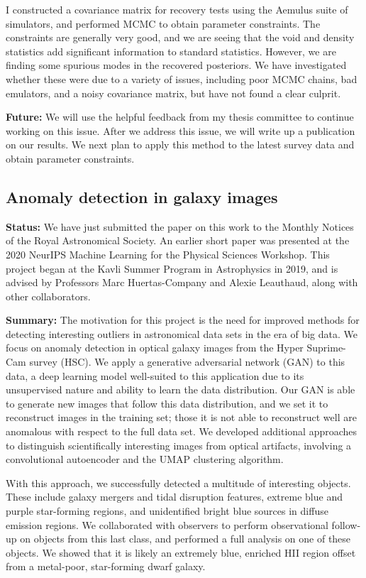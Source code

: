 \documentclass{article}
\begin{document}
I constructed a covariance matrix for recovery tests using the Aemulus suite of simulators, and performed MCMC to obtain parameter constraints.
The constraints are generally very good, and we are seeing that the void and density statistics add significant information to standard statistics.
However, we are finding some spurious modes in the recovered posteriors.
We have investigated whether these were due to a variety of issues, including poor MCMC chains, bad emulators, and a noisy covariance matrix, but have not found a clear culprit.

\textbf{Future:}
We will use the helpful feedback from my thesis committee to continue working on this issue.
After we address this issue, we will write up a publication on our results.
We next plan to apply this method to the latest survey data and obtain parameter constraints.

\subsection{Anomaly detection in galaxy images}

\hspace{\parindent} \textbf{Status:}
We have just submitted the paper on this work to the Monthly Notices of the Royal Astronomical Society.
An earlier short paper was presented at the 2020 NeurIPS Machine Learning for the Physical Sciences Workshop.
This project began at the Kavli Summer Program in Astrophysics in 2019, and is advised by Professors Marc Huertas-Company and Alexie Leauthaud, along with other collaborators.

\textbf{Summary:}
The motivation for this project is the need for improved methods for detecting interesting outliers in astronomical data sets in the era of big data.
We focus on anomaly detection in optical galaxy images from the Hyper Suprime-Cam survey (HSC).
We apply a generative adversarial network (GAN) to this data, a deep learning model well-suited to this application due to its unsupervised nature and ability to learn the data distribution.
Our GAN is able to generate new images that follow this data distribution, and we set it to reconstruct images in the training set; those it is not able to reconstruct well are anomalous with respect to the full data set.
We developed additional approaches to distinguish scientifically interesting images from optical artifacts, involving a convolutional autoencoder and the UMAP clustering algorithm.

With this approach, we successfully detected a multitude of interesting objects.
These include galaxy mergers and tidal disruption features, extreme blue and purple star-forming regions, and unidentified bright blue sources in diffuse emission regions.
We collaborated with observers to perform observational follow-up on objects from this last class, and performed a full analysis on one of these objects.
We showed that it is likely an extremely blue, enriched HII region offset from a metal-poor, star-forming dwarf galaxy.
\end{document}
